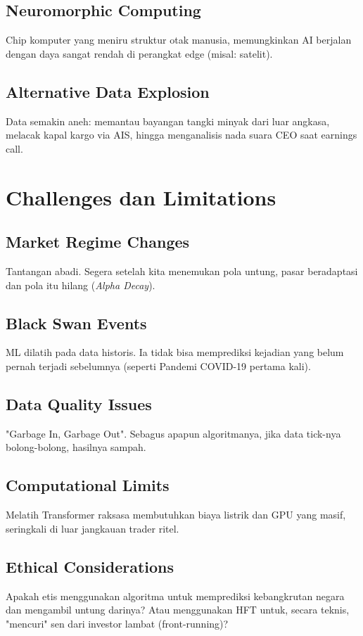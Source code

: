 \documentclass[12pt,a4paper]{book}
\begin{document}
\section{Neuromorphic Computing}
Chip komputer yang meniru struktur otak manusia, memungkinkan AI berjalan dengan daya sangat rendah di perangkat edge (misal: satelit).

\section{Alternative Data Explosion}
Data semakin aneh: memantau bayangan tangki minyak dari luar angkasa, melacak kapal kargo via AIS, hingga menganalisis nada suara CEO saat earnings call.

\chapter{Challenges dan Limitations}
\section{Market Regime Changes}
Tantangan abadi. Segera setelah kita menemukan pola untung, pasar beradaptasi dan pola itu hilang (\textit{Alpha Decay}).

\section{Black Swan Events}
ML dilatih pada data historis. Ia tidak bisa memprediksi kejadian yang belum pernah terjadi sebelumnya (seperti Pandemi COVID-19 pertama kali).

\section{Data Quality Issues}
"Garbage In, Garbage Out". Sebagus apapun algoritmanya, jika data tick-nya bolong-bolong, hasilnya sampah.

\section{Computational Limits}
Melatih Transformer raksasa membutuhkan biaya listrik dan GPU yang masif, seringkali di luar jangkauan trader ritel.

\section{Ethical Considerations}
Apakah etis menggunakan algoritma untuk memprediksi kebangkrutan negara dan mengambil untung darinya? Atau menggunakan HFT untuk, secara teknis, "mencuri" sen dari investor lambat (front-running)?
\end{document}
